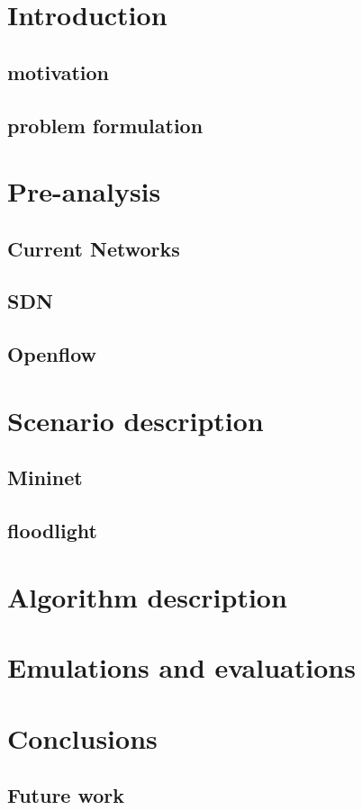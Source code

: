 \chapter{Introduction}
\section{motivation}
\section{problem formulation}

\chapter{Pre-analysis}
\section{Current Networks}
\section{SDN}
\section{Openflow}


\chapter{Scenario description}
\section{Mininet}
\section{floodlight}

\chapter{Algorithm description}

\chapter{Emulations and evaluations}
\section{}

\chapter{Conclusions}
\section{Future work}
